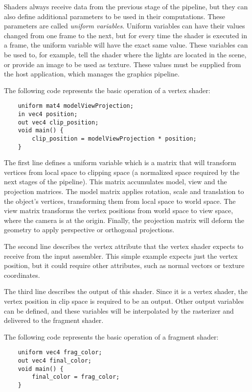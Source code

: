 Shaders always receive data from the previous stage of the pipeline, but they can also define additional parameters to be used in their computations. These parameters are called \textit{uniform variables}. Uniform variables can have their values changed from one frame to the next, but for every time the shader is executed in a frame, the uniform variable will have the exact same value. These variables can be used to, for example, tell the shader where the lights are located in the scene, or provide an image to be used as texture. These values must be supplied from the host application, which manages the graphics pipeline.

The following code represents the basic operation of a vertex shader:

\begin{verbatim}
    uniform mat4 modelViewProjection;
    in vec4 position;
    out vec4 clip_position;
    void main() {
        clip_position = modelViewProjection * position;
    }
\end{verbatim}

The first line defines a uniform variable which is a matrix that will transform vertices from local space to clipping space (a normalized space required by the next stages of the pipeline). This matrix accumulates model, view and the projection matrices. The model matrix applies rotation, scale and translation to the object's vertices, transforming them from local space to world space. The view matrix transforms the vertex positions from world space to view space, where the camera is at the origin. Finally, the projection matrix will deform the geometry to apply perspective or orthogonal projections.

The second line describes the vertex attribute that the vertex shader expects to receive from the input assembler. This simple example expects just the vertex position, but it could require other attributes, such as normal vectors or texture coordinates.

The third line describes the output of this shader. Since it is a vertex shader, the vertex position in clip space is required to be an output. Other output variables can be defined, and these variables will be interpolated by the rasterizer and delivered to the fragment shader.

The following code represents the basic operation of a fragment shader:

\begin{verbatim}
    uniform vec4 frag_color;
    out vec4 final_color;
    void main() {
        final_color = frag_color;
    }
\end{verbatim}

